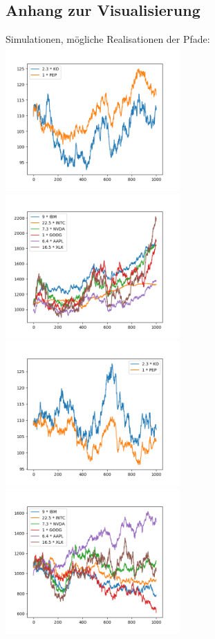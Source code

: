 \documentclass[12pt]{article}
\begin{document}
	\subsection*{Anhang zur Visualisierung}
	Simulationen, mögliche Realisationen der Pfade:
	\\
	\includegraphics[width=0.5\textwidth]{Teil1_1}	
	\includegraphics[width=0.5\textwidth]{Teil2_1}
	\includegraphics[width=0.5\textwidth]{Teil1_2}	
	\includegraphics[width=0.5\textwidth]{Teil2_2}
\end{document}
